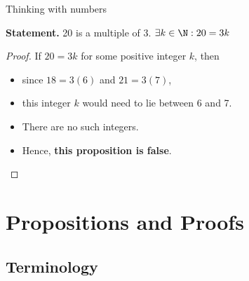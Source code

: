 \documentclass[11pt,aspectratio=1610]{beamer}
\begin{document}
\begin{frame}{Thinking with numbers}
	
%	
%	
	\pause
	
	\begin{example}
		\textbf{Statement.} 20 is a multiple of $3$. \hspace{3mm} $\exists k \in \N : 20=3k$
	\end{example}
	
	\pause
	
	\begin{proof}
		If $20 = 3k$ for some positive integer $k$, then \p
		
		
		\begin{itemize}
			\item since $18 = 3(6)$ and $21 = 3(7)$, \p
			\item this integer $k$ would need to lie between 6 and 7.\p
			\item There are no such integers.\p
			\item Hence, \textbf{this proposition is false}.
		\end{itemize}
		
		
		     
	\end{proof}
	\vspace{3in}
\end{frame}










\section{Propositions and Proofs}
\subsection{Terminology}
			
\end{document}
